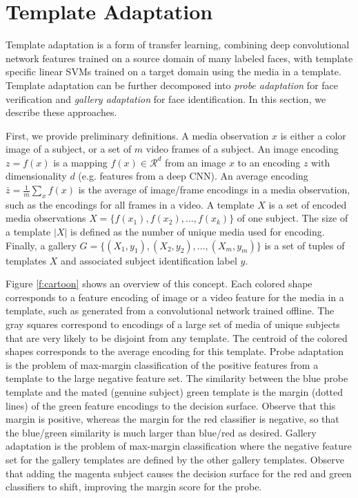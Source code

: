 \documentclass[10pt,twocolumn,letterpaper]{article}
\theoremstyle{definition}		\newtheorem{defn}[thm]{Definition}
\begin{document}
\section{Template Adaptation}
\label{s:template_adaptation}




Template adaptation is a form of transfer learning, combining deep convolutional network features trained on a source domain of many labeled faces, with template specific linear SVMs trained on a target domain using the media in a template.  Template adaptation can be further decomposed into {\em probe adaptation} for face verification and {\em gallery adaptation} for face identification.
In this section, we describe these approaches.

First, we provide preliminary definitions.  A media observation $x$ is either a color image of a subject, or a set of $m$ video frames of a subject.      
An image encoding $z=f(x)$ is a mapping $f(x) \in \mathcal{R}^d$ from an image $x$ to an encoding $z$ with dimensionality $d$ (e.g. features from a deep CNN).  An average encoding $\bar{z} = \frac{1}{m} \sum_x f(x)$ is the average of image/frame encodings in a media observation, such as the encodings for all frames in a video.  A template $X$ is a set of encoded media observations $X = \{f(x_1), f(x_2),\ldots, f(x_k)\}$ of one subject.  The size of a template $|X|$ is defined as the number of unique media used for encoding.  Finally, a gallery $G=\{(X_1,y_1),(X_2,y_2),\ldots,(X_m,y_m)\}$ is a set of tuples of templates $X$ and associated subject identification label $y$. 

Figure \ref{f:cartoon} shows an overview of this concept.  Each colored shape corresponds to a feature encoding of image or a video feature for the media in a template, such as generated from a convolutional network trained offline. The gray squares correspond to encodings of a large set of media of unique subjects that are very likely to be disjoint from any template.  The centroid of the colored shapes corresponds to the average encoding for this template.  
Probe adaptation is the problem of max-margin classification of the positive features from a template to the large negative feature set.  The similarity between the blue probe template and the mated (genuine subject) green template is the margin (dotted lines) of the green feature encodings to the decision surface.  Observe that this margin is positive, whereas the margin for the red classifier is negative, so that the blue/green similarity is much larger than blue/red as desired.  Gallery adaptation is the problem of max-margin classification where the negative feature set for the gallery templates are defined by the other gallery templates.  Observe that adding the magenta subject causes the decision surface for the red and green classifiers to shift, improving the margin score for the probe. 
\end{document}
